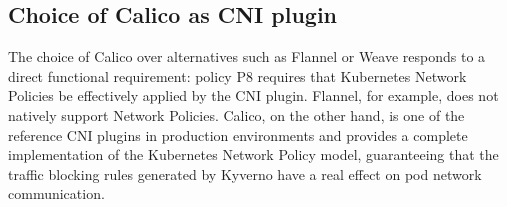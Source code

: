 \subsection{Choice of Calico as CNI plugin}

The choice of Calico \cite{calico_docs} over alternatives such as Flannel or Weave responds to a direct functional requirement: policy P8 requires that Kubernetes Network Policies be effectively applied by the CNI plugin. Flannel, for example, does not natively support Network Policies. Calico, on the other hand, is one of the reference CNI plugins in production environments and provides a complete implementation of the Kubernetes Network Policy model, guaranteeing that the traffic blocking rules generated by Kyverno have a real effect on pod network communication.
